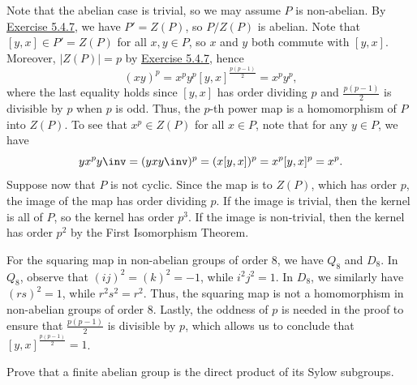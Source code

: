 \begin{sol}
    Note that the abelian case is trivial, so we may assume $P$ is non-abelian. By \hyperref[ex5.4.7]{Exercise 5.4.7}, we have $P' = Z(P)$, so $P/Z(P)$ is abelian. Note that $[y, x] \in P' = Z(P)$ for all $x, y \in P$, so $x$ and $y$ both commute with $[y, x]$. Moreover, $|Z(P)| = p$ by \hyperref[ex5.4.7]{Exercise 5.4.7}, hence
    \[(xy)^p = x^p y^p [y, x]^{\frac{p(p-1)}{2}} = x^p y^p,\]
    where the last equality holds since $[y, x]$ has order dividing $p$ and $\frac{p(p-1)}{2}$ is divisible by $p$ when $p$ is odd. Thus, the $p$-th power map is a homomorphism of $P$ into $Z(P)$. To see that $x^p \in Z(P)$ for all $x \in P$, note that for any $y \in P$, we have
    \[y x^py\inv = (y x y\inv)^p = (x [y, x])^p = x^p [y, x]^p = x^p.\]
    Suppose now that $P$ is not cyclic. Since the map is to $Z(P)$, which has order $p$, the image of the map has order dividing $p$. If the image is trivial, then the kernel is all of $P$, so the kernel has order $p^3$. If the image is non-trivial, then the kernel has order $p^2$ by the First Isomorphism Theorem.

    For the squaring map in non-abelian groups of order 8, we have $Q_8$ and $D_8$. In $Q_8$, observe that $(ij)^2 = (k)^2 = -1$, while $i^2j^2 = 1$. In $D_8$, we similarly have $(rs)^2 = 1$, while $r^2s^2 = r^2$. Thus, the squaring map is not a homomorphism in non-abelian groups of order 8. Lastly, the oddness of $p$ is needed in the proof to ensure that $\frac{p(p-1)}{2}$ is divisible by $p$, which allows us to conclude that $[y, x]^{\frac{p(p-1)}{2}} = 1$.
\end{sol}

\begin{specialexercise}\label{ex5.4.10}
    Prove that a finite abelian group is the direct product of its Sylow subgroups.
\end{specialexercise}

